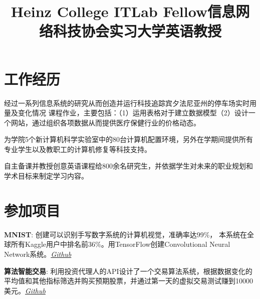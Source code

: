 \documentclass[margin]{res}
\begin{document}
\begin{CJK*}{UTF8}{gbsn}
\begin{resume}
\section{工作经历}
\title{\textbf{Heinz College ITLab Fellow}}
\begin{position}
经过一系列信息系统的研究从而创造并运行科技追踪宾夕法尼亚州的停车场实时用量及变化情况
课程作业，主要包括：（1）运用表格对于建立数据模型（2）设计一个网站，通过组织各项数据从而提供医疗保健行业的价格动态。
\end{position}

\title{\textbf{信息网络科技协会实习}}
\begin{position}
为学院5个新计算机科学实验室中的80台计算机配置环境，另外在学期间提供所有专业学生以及教职工的计算机修复等科技支持。
\end{position}

\title{\textbf{大学英语教授}}
\begin{position}
自主备课并教授创意英语课程给800余名研究生，并依据学生对未来的职业规划和学术目标来制定学习内容。
\end{position}

\section{参加项目}
\par
\textbf{MNIST}: 
创建可以识别手写数字系统的计算机视觉，准确率达99\%， 本系统在全球所有Kaggle用户中排名前36\%。用TensorFlow创建Convolutional Neural Network系统。\textit{\href{https://github.com/lucaskjaero/MNIST}{Github}}
 
\par
\textbf{算法智能交易}:
利用投资代理人的API设计了一个交易算法系统，根据数据变化的平均值和其他指标筛选并购买预期股票，并通过第一天的虚拟交易测试赚到10000美元。\textit{\href{https://github.com/lucaskjaero/Algorithmic-Trading-API}{Github}}



\end{resume}
\end{CJK*}
\end{document}
